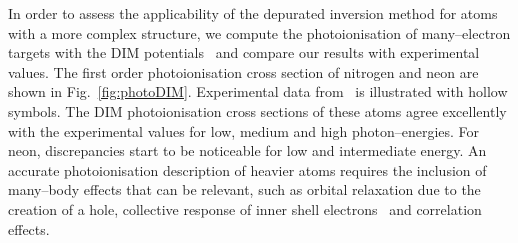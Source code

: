 \documentclass[10pt]{article}
\begin{document}
In order to assess the applicability of the depurated inversion method
for atoms with a more complex structure, we compute the 
photoionisation of many--electron targets with the DIM 
potentials~\cite{Mendez2016} and compare our results with 
experimental values. 
The first order photoionisation cross section of nitrogen and neon 
are shown in Fig.~\ref{fig:photoDIM}. Experimental data 
from~\cite{Henke1993,Samson1990,Samson2002,Stolte2016} is illustrated 
with hollow symbols. The DIM photoionisation cross sections
of these atoms agree excellently with the experimental values for 
low, medium and high photon--energies. For neon, discrepancies start 
to be noticeable for low and intermediate energy. An accurate 
photoionisation description of heavier atoms requires the inclusion 
of many--body effects that can be relevant, such as orbital 
relaxation due to the creation of a hole, collective response 
of inner shell electrons~\cite{Ederer1964} and correlation effects.
\end{document}
